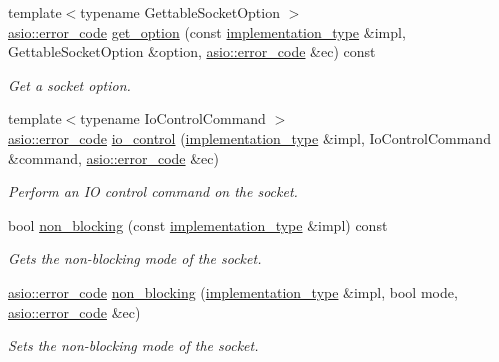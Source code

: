 \begin{DoxyCompactItemize}
{\footnotesize template$<$typename Gettable\+Socket\+Option $>$ }\\\hyperlink{classasio_1_1error__code}{asio\+::error\+\_\+code} \hyperlink{classasio_1_1seq__packet__socket__service_a60a2dfce4ec9dcd87dc92363e220ac39}{get\+\_\+option} (const \hyperlink{classasio_1_1seq__packet__socket__service_a6e1d2027450d7a5d8ea7896a3de0c8ff}{implementation\+\_\+type} \&impl, Gettable\+Socket\+Option \&option, \hyperlink{classasio_1_1error__code}{asio\+::error\+\_\+code} \&ec) const 
\begin{DoxyCompactList}\small\item\em Get a socket option. \end{DoxyCompactList}\item 
{\footnotesize template$<$typename Io\+Control\+Command $>$ }\\\hyperlink{classasio_1_1error__code}{asio\+::error\+\_\+code} \hyperlink{classasio_1_1seq__packet__socket__service_ab00709bf942700f4fc5c486460ebcd04}{io\+\_\+control} (\hyperlink{classasio_1_1seq__packet__socket__service_a6e1d2027450d7a5d8ea7896a3de0c8ff}{implementation\+\_\+type} \&impl, Io\+Control\+Command \&command, \hyperlink{classasio_1_1error__code}{asio\+::error\+\_\+code} \&ec)
\begin{DoxyCompactList}\small\item\em Perform an I\+O control command on the socket. \end{DoxyCompactList}\item 
bool \hyperlink{classasio_1_1seq__packet__socket__service_a3121fda756c5dfca4c800def0bddcee5}{non\+\_\+blocking} (const \hyperlink{classasio_1_1seq__packet__socket__service_a6e1d2027450d7a5d8ea7896a3de0c8ff}{implementation\+\_\+type} \&impl) const 
\begin{DoxyCompactList}\small\item\em Gets the non-\/blocking mode of the socket. \end{DoxyCompactList}\item 
\hyperlink{classasio_1_1error__code}{asio\+::error\+\_\+code} \hyperlink{classasio_1_1seq__packet__socket__service_ab32a72ef2a6451354b47d1638b99d531}{non\+\_\+blocking} (\hyperlink{classasio_1_1seq__packet__socket__service_a6e1d2027450d7a5d8ea7896a3de0c8ff}{implementation\+\_\+type} \&impl, bool mode, \hyperlink{classasio_1_1error__code}{asio\+::error\+\_\+code} \&ec)
\begin{DoxyCompactList}\small\item\em Sets the non-\/blocking mode of the socket. \end{DoxyCompactList}\item 

\end{DoxyCompactItemize}
